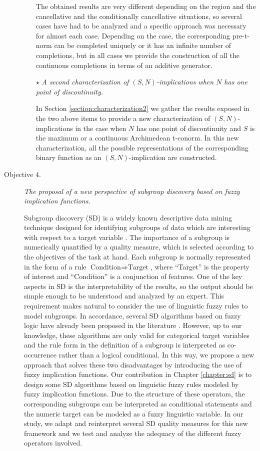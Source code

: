 \begin{description}
\begin{itemize}
		The obtained results are very different depending on the region and the cancellative and the conditionally cancellative situations, so several cases have had to be analyzed and a specific approach was necessary for almost each case. Depending on the case, the corresponding pre-t-norm can be completed uniquely or it has an infinite number of completions, but in all cases we provide the construction of all the continuous completions in terms of an additive generator.
		
		\item[$\star$] \textit{A second characterization of $(S,N)$-implications when $N$ has one point of discontinuity.}
		
		In Section \ref{section:characterization2} we gather the results exposed in the two above items to provide a new characterization of $(S,N)$-implications in the case when $N$ has one point of discontinuity and $S$ is the maximum or a continuous Archimedean t-conorm. In this new characterization, all the possible representations of the corresponding binary function as an $(S,N)$-implication are constructed.
		
		
	\end{itemize}
	\item[Objective 4.] \textit{The proposal of a new perspective of subgroup discovery based on fuzzy implication functions.}
	
	Subgroup discovery (SD) is a widely known descriptive data mining technique designed for identifying subgroups of data which are interesting with respect to a target variable \cite{Atzmueller2015,Helal2016}. The importance of a subgroup is numerically quantified by a quality measure, which is selected according to the objectives of the task at hand. Each subgroup is normally represented in the form of a rule $\text{Condition} \Rightarrow \text{Target}$, where ``Target'' is the property of interest and ``Condition'' is a conjunction of features. 
	One of the key aspects in SD is the interpretability of the results, so the output should be simple enough to be understood and analyzed by an expert. This requirement makes natural to consider the use of linguistic fuzzy rules to model subgroups. In accordance, several SD algorithms based on fuzzy logic have already been proposed in the literature \cite{Herrera2011}. However, up to our knowledge, these algorithms are only valid for categorical target variables and the rule form in the definition of a subgroup is interpreted as co-occurrence rather than a logical conditional. In this way, we propose a new approach that solves these two disadvantages by introducing the use of fuzzy implication functions. 
	Our contribution in Chapter \ref{chapter:sd} is to design some SD algorithms based on linguistic fuzzy rules modeled by fuzzy implication functions. Due to the structure of these operators, the corresponding subgroups can be interpreted as conditional statements and the numeric target can be modeled as a fuzzy linguistic variable. In our study, we adapt and reinterpret several SD quality measures for this new framework and we test and analyze the adequacy of the different fuzzy operators involved. 
\end{description}

